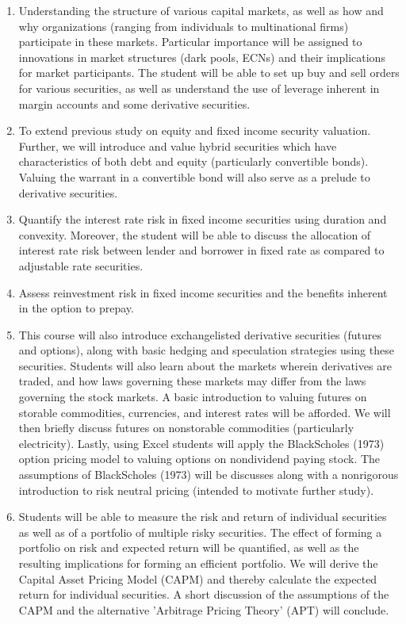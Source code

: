 \documentclass{article}
\begin{document}
\begin{enumerate}
\item  Understanding the structure of various capital markets, as well as how and why organizations
(ranging from individuals to multinational firms) participate in these markets. Particular importance will
be assigned to innovations in market structures (dark pools, ECNs) and their implications for market
participants. The student will be able to set up buy and sell orders for various securities, as well as
understand the use of leverage inherent in margin accounts and some derivative securities.
\item To extend previous study on equity and fixed income security valuation. Further, we will introduce
and value hybrid securities which have characteristics of both debt and equity (particularly convertible
bonds). Valuing the warrant in a convertible bond will also serve as a prelude to derivative securities.  
\item Quantify the interest rate risk in fixed income securities using duration and convexity. Moreover, the
student will be able to discuss the allocation of interest rate risk between lender and borrower in fixed
rate as compared to adjustable rate securities.
\item Assess reinvestment risk in fixed income securities and the benefits inherent in the option to prepay. 
\item This course will also introduce exchange­listed derivative securities (futures and options), along with
basic hedging and speculation strategies using these securities. Students will also learn about the
markets wherein derivatives are traded, and how laws governing these markets may differ from the laws
governing the stock markets. A basic introduction to valuing futures on storable commodities,
currencies, and interest rates will be afforded. We will then briefly discuss futures on non­storable commodities (particularly electricity). Lastly, using Excel students will apply the Black­Scholes (1973)
option pricing model to valuing options on non­dividend paying stock. The assumptions of
Black­Scholes (1973) will be discusses along with a non­rigorous introduction to risk neutral pricing
(intended to motivate further study).
\item Students will be able to measure the risk and return of individual securities as well as of a portfolio of
multiple risky securities. The effect of forming a portfolio on risk and expected return will be quantified,
as well as the resulting implications for forming an efficient portfolio. We will derive the Capital Asset
Pricing Model (CAPM) and thereby calculate the expected return for individual securities. A short
discussion of the assumptions of the CAPM and the alternative 'Arbitrage Pricing Theory' (APT) will
conclude.
\end{enumerate}
\end{document}
